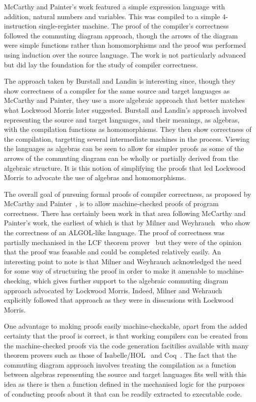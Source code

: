\documentclass[a4paper,10pt]{article}
\begin{document}
McCarthy and Painter's work featured a simple expression language with addition,
natural numbers and variables.  This was compiled to a simple 4-instruction
single-register machine. The proof of the compiler's correctness followed the
commuting diagram approach, though the arrows of the diagram were simple
functions rather than homomorphisms and the proof was performed using induction
over the source language. The work is not particularly advanced but did lay the
foundation for the study of compiler correctness.

The approach taken by Burstall and Landin is interesting since, though
they show correctness of a compiler for the same source and target languages as
McCarthy and Painter, they use a more algebraic approach that better matches
what Lockwood Morris later suggested.  Burstall and Landin's approach involved
representing the source and target languages, and their meanings, as algebras,
with the compilation functions as homomorphisms. They then show correctness of
the compilation, targetting several intermediate machines in the
process. Viewing the languages as algebras can be seen to allow for simpler
proofs as some of the arrows of the commuting diagram can be wholly or partially
derived from the algebraic structure. It is this notion of simplifying the
proofs that led Lockwood Morris to advocate the use of algebras and
homomorphisms.

The overall goal of pursuing formal proofs of compiler correctness, as proposed
by McCarthy and Painter~\cite{mccarthy1967}, is to allow machine-checked proofs
of program correctness. There has certainly been work in that area following
McCarthy and Painter's work, the earliest of which is that by Milner and
Weyhrauch~\cite{milner1972} who show the correctness of an ALGOL-like
language. The proof of correctness was partially mechanised in the LCF theorem
prover~\cite{milner1972a} but they were of the opinion that the proof was
feasable and could be completed relatively easily. An interesting point to note
is that Milner and Weyhrauch acknowledged the need for some way of structuring
the proof in order to make it amenable to machine-checking, which gives further
support to the algebraic commuting diagram approach advocated by Lockwood
Morris. Indeed, Milner and Wehrauch explicitly followed that approach as they
were in disscusions with Lockwood Morris.

One advantage to making proofs easily machine-checkable, apart from the added
certainty that the proof is correct, is that working compilers can be created
from the machine-checked proofs via the code generation facitilies available
with many theorem provers such as those of Isabelle/HOL~\cite{haftmann2007} and
Coq~\cite{letouzey2003, letouzey2008}. The fact that the commuting diagram
approach involves treating the compilation as a function between algebras
representing the source and target languages fits well with this idea as there
is then a function defined in the mechanised logic for the purposes of
conducting proofs about it that can be readily extracted to executable code.
\end{document}
